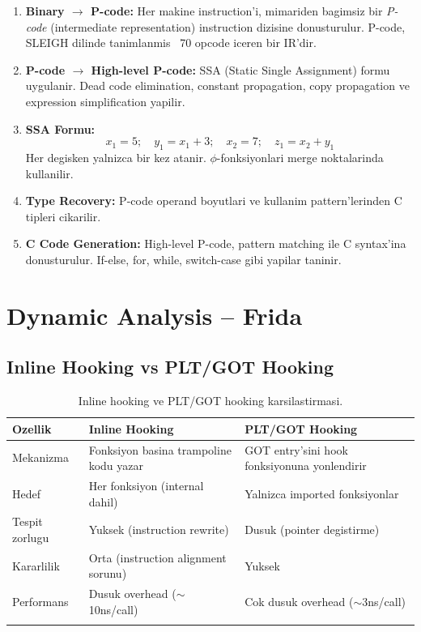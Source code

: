 \begin{enumerate}
  \item \textbf{Binary $\to$ P-code:} Her makine instruction'i, mimariden
        bagimsiz bir \emph{P-code} (intermediate representation) instruction
        dizisine donusturulur. P-code, SLEIGH dilinde tanimlanmis ~70 opcode iceren
        bir IR'dir.
  \item \textbf{P-code $\to$ High-level P-code:} SSA (Static Single Assignment)
        formu uygulanir. Dead code elimination, constant propagation,
        copy propagation ve expression simplification yapilir.
  \item \textbf{SSA Formu:}
  \begin{equation}
    x_1 = 5; \quad y_1 = x_1 + 3; \quad x_2 = 7; \quad z_1 = x_2 + y_1
    \label{eq:ssa-form}
  \end{equation}
  Her degisken yalnizca bir kez atanir. $\phi$-fonksiyonlari merge
  noktalari\-nda kullanilir.
  \item \textbf{Type Recovery:} P-code operand boyutlari ve kullanim
        pattern'lerinden C tipleri cikarilir.
  \item \textbf{C Code Generation:} High-level P-code, pattern matching
        ile C syntax'ina donusturulur. If-else, for, while, switch-case
        gibi yapilar taninir.
\end{enumerate}


\section{Dynamic Analysis -- Frida}
\label{sec:frida-dynamic}

\subsection{Inline Hooking vs PLT/GOT Hooking}

\begin{longtable}{lp{5cm}p{5cm}}
\toprule
\textbf{Ozellik} & \textbf{Inline Hooking} & \textbf{PLT/GOT Hooking} \\
\midrule
\endhead
Mekanizma & Fonksiyon basina trampoline kodu yazar & GOT entry'sini hook fonksiyonuna yonlendirir \\
Hedef & Her fonksiyon (internal dahil) & Yalnizca imported fonksiyonlar \\
Tespit zorlu\-gu & Yuksek (instruction rewrite) & Dusuk (pointer degistirme) \\
Kararlili\-k & Orta (instruction alignment sorunu) & Yuksek \\
Performans & Dusuk overhead ($\sim$10ns/call) & Cok dusuk overhead ($\sim$3ns/call) \\
\bottomrule
\caption{Inline hooking ve PLT/GOT hooking karsilastirmasi.}
\label{tab:hook-comparison}
\end{longtable}

